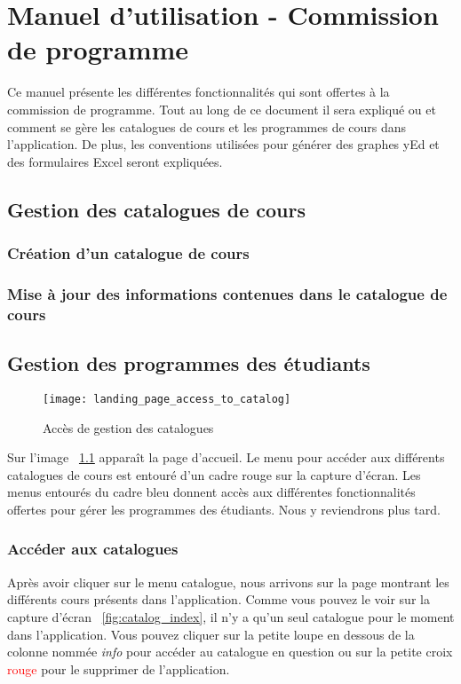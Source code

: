 \label{AppendixA}
\chapter{Manuel d'utilisation - Commission de programme}
Ce manuel présente les différentes fonctionnalités qui sont offertes à la commission de programme. Tout au long de ce document il sera expliqué ou et comment se gère les catalogues de cours et les programmes de cours dans l'application. De plus, les conventions utilisées pour générer des graphes yEd et des formulaires Excel seront expliquées. 
\section{Gestion des catalogues de cours}


\subsection{Création d'un catalogue de cours}
\subsection{Mise à jour des informations contenues dans le catalogue de cours}
\section{Gestion des programmes des étudiants}

\begin{figure}
\centering
\texttt{[image: landing\_page\_access\_to\_catalog]}
\caption{Accès de gestion des catalogues}
\label{fig:landing_page_catalog}
\end{figure}

Sur l'image ~\ref{fig:landing_page_catalog} apparaît la page d'accueil. Le menu pour accéder aux différents catalogues de cours est entouré d'un cadre rouge sur la capture d'écran. Les menus entourés du cadre bleu donnent accès aux différentes fonctionnalités offertes pour gérer les programmes des étudiants. Nous y reviendrons plus tard. 

\subsection{Accéder aux catalogues}
Après avoir cliquer sur le menu catalogue, nous arrivons sur la page montrant les différents cours présents dans l'application. Comme vous pouvez le voir sur la capture d'écran ~\ref{fig:catalog_index}, il n'y a qu'un seul catalogue pour le moment dans l'application. Vous pouvez cliquer sur la petite loupe en dessous de la colonne nommée \textit{info} pour accéder au catalogue en question ou sur la petite croix \textcolor{red}{rouge} pour le supprimer de l'application.

